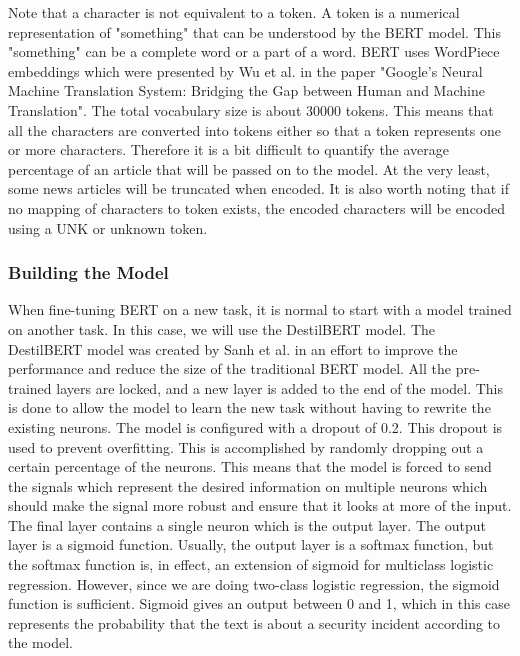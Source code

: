 Note that a character is not equivalent to a token. A token is a numerical representation of "something" that can be understood by the BERT model. This "something" can be a complete word or a part of a word. BERT uses WordPiece embeddings which were presented by Wu et al. in the paper "Google's Neural Machine Translation System: Bridging the Gap between Human and Machine Translation"\cite{wu2016google}. The total vocabulary size is about 30000 tokens. This means that all the characters are converted into tokens either so that a token represents one or more characters. Therefore it is a bit difficult to quantify the average percentage of an article that will be passed on to the model. At the very least, some news articles will be truncated when encoded. It is also worth noting that if no mapping of characters to token exists, the encoded characters will be encoded using a UNK or unknown token. 

\subsubsection{Building the Model}
When fine-tuning BERT on a new task, it is normal to start with a model trained on another task. In this case, we will use the DestilBERT model. The DestilBERT model was created by Sanh et al. \cite{sanh2019distilbert} in an effort to improve the performance and reduce the size of the traditional BERT model. All the pre-trained layers are locked, and a new layer is added to the end of the model. This is done to allow the model to learn the new task without having to rewrite the existing neurons. The model is configured with a dropout of 0.2. This dropout is used to prevent overfitting. This is accomplished by randomly dropping out a certain percentage of the neurons. This means that the model is forced to send the signals which represent the desired information on multiple neurons which should make the signal more robust and ensure that it looks at more of the input. The final layer contains a single neuron which is the output layer. The output layer is a sigmoid function. Usually, the output layer is a softmax function, but the softmax function is, in effect, an extension of sigmoid for multiclass logistic regression. However, since we are doing two-class logistic regression, the sigmoid function is sufficient. Sigmoid gives an output between 0 and 1, which in this case represents the probability that the text is about a security incident according to the model.


